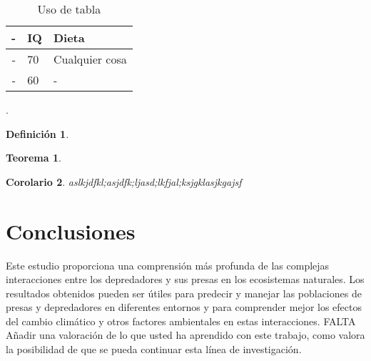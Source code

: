 \documentclass{wscpaperproc}
\theoremstyle{wsc}
\newtheorem{theorem}{Teorema}
\newtheorem{corollary}[theorem]{Corolario}
\newtheorem{definition}{Definici\'on}
\begin{document}
\begin{table}[htb]
\centering
\caption{Uso de tabla\label{tab: first}}
\begin{tabular}{rll}
\hline
-& IQ & Dieta\\ \hline
- & 70 & Cualquier cosa\\
- & 60 &- \\
\hline
\end{tabular}
\end{table}



.
\begin{definition}

\end{definition}

\begin{theorem}

\end{theorem}

\begin{corollary}
aslkjdfkl;asjdfk;ljasd;lkfjal;ksjgklasjkgajsf
\end{corollary}


\section*{Conclusiones}
Este estudio proporciona una comprensi\'on más profunda de las complejas interacciones entre los depredadores y sus presas en 
los ecosistemas naturales. Los resultados obtenidos pueden ser \'utiles para predecir y manejar las poblaciones de presas y 
depredadores en diferentes entornos y para comprender mejor los efectos del cambio clim\'atico y otros factores ambientales 
en estas interacciones. FALTA Añadir una valoración de lo que usted ha aprendido con este trabajo, como valora la
posibilidad de que se pueda continuar esta línea de investigación.
\end{document}
